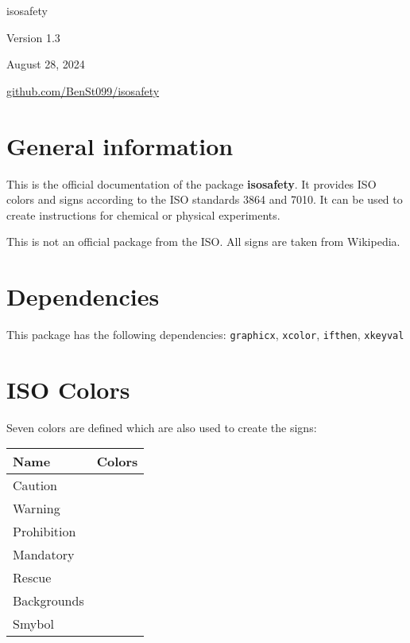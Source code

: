 \documentclass{article}
\begin{document}
\begin{center}
    {\Huge isosafety} \vspace{5mm}

    {\Large Version 1.3}\vspace{5mm}

    {\Large August 28, 2024}\vspace{5mm}

    \href{https://github.com/BenSt099/isosafety}{github.com/BenSt099/isosafety} 
\end{center}\vspace{5mm}

\section{General information}

This is the official documentation of the package \textbf{isosafety}. It provides ISO colors and signs according to the ISO standards
3864 and 7010. It can be used to create instructions for chemical or physical experiments.\vspace{5mm}


\noindent This is not an official package from the ISO. All signs are taken from Wikipedia.

\section{Dependencies}

This package has the following dependencies: \texttt{graphicx}, \texttt{xcolor}, \texttt{ifthen}, \texttt{xkeyval}

\section{ISO Colors}

Seven colors are defined which are also used to create the signs: \vspace{5mm}

\renewcommand{\arraystretch}{1.2}
    \begin{tabular}{ll}
        \hline
        Name & Colors \\ 
        \hline
        Caution & \cellcolor{Caution} \\
        Warning & \cellcolor{Warning} \\
        Prohibition & \cellcolor{Prohibition} \\
        Mandatory & \cellcolor{Mandatory} \\
        Rescue & \cellcolor{Rescue} \\
        Backgrounds & \cellcolor{Backgrounds} \\
        Smybol & \cellcolor{Symbol} \\
        \hline
\end{tabular}\vspace{5mm}
\end{document}
